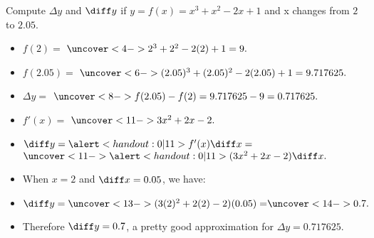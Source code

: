 \begin{frame}
\begin{example}%
Compute $\Delta y$ and $\diff y$ if $y = f(x) = x^3 + x^2 - 2x + 1$ and x changes from $2$ to $2.05$.
\begin{itemize}
\item<2-| alert@3-4>  $f(2) =$ $\uncover<4->{2^3+2^2-2(2)+1 = 9.}$
\item<2-| alert@5-6>  $f(2.05) =$ $\uncover<6->{(2.05)^3+(2.05)^2-2(2.05)+1 = 9.717625.}$
\item<2-| alert@7-8>  $\Delta y =$ $\uncover<8->{f(2.05) - f(2) = 9.717625 - 9 = 0.717625.}$
\item<9-| alert@10-11>  $f'(x) = $ $\uncover<11->{3x^2 + 2x -2.}$
\item<9->  $\diff y = \alert<handout:0| 11>{f'(x)}\diff x = $ $\uncover<11->{\alert<handout:0| 11>{(3x^2+2x-2)}\diff x.}$
\item<12->  When $x = 2$ and $\diff x = 0.05$, we have:
\item<12-| alert@13-14>  $\diff y = \uncover<13->{(3(2)^2 + 2(2) - 2)(0.05) =} \uncover<14->{0.7.}$
\item<15->  Therefore $\diff y = 0.7$, a pretty good approximation for $\Delta y = 0.717625$.
\end{itemize}
\end{example}
\end{frame}
